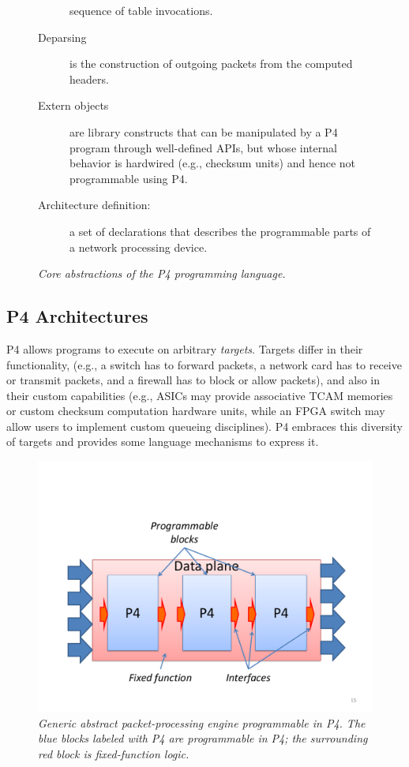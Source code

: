 \begin{figure}[h]
\begin{mdframed}[style=mdstyle]
\begin{description}
  sequence of table invocations.
\item[Deparsing] is the construction of outgoing packets from the
  computed headers.
\item[Extern objects] are library constructs that can be manipulated
  by a P4 program through well-defined APIs, but whose internal
  behavior is hardwired (e.g., checksum units) and hence not
  programmable using P4.
\item[Architecture definition:] a set of declarations that describes
  the programmable parts of a network processing device.
    \end{description}
  \end{mdframed}
  \caption{\sl Core abstractions of the P4 programming language.\label{fig:abstractions}}
\end{figure}

\subsection{P4 Architectures}

P4 allows programs to execute on arbitrary \emph{targets}.  Targets
differ in their functionality, (e.g., a switch has to forward packets,
a network card has to receive or transmit packets, and a firewall has
to block or allow packets), and also in their custom capabilities
(e.g., ASICs may provide associative TCAM memories or custom checksum
computation hardware units, while an FPGA switch may allow users to
implement custom queueing disciplines).  P4 embraces this diversity of
targets and provides some language mechanisms to express it.

\begin{figure}[h]
  \centerline{\includegraphics[width=.5\textwidth,clip,trim=1in 0.9in
      .8in 1.8in]{architecture.pdf}}
  \caption{\sl Generic abstract packet-processing engine programmable
    in P4.  The blue blocks labeled with P4 are programmable in P4; the
    surrounding red block is fixed-function
    logic.\label{fig:architecture}}
\end{figure}

